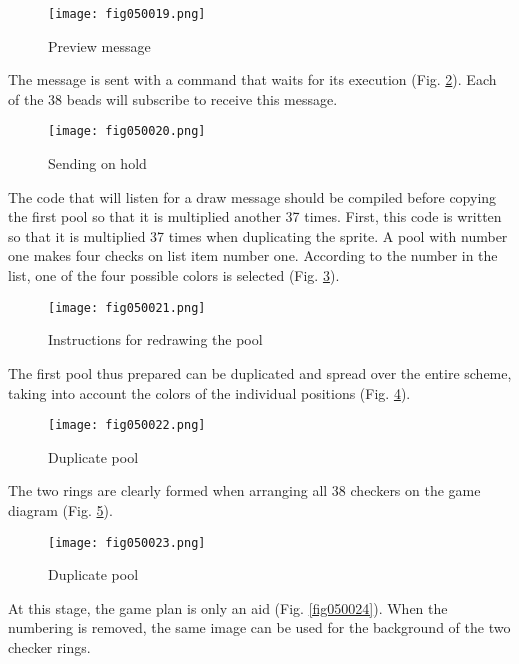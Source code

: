 \begin{figure}[H]
   \centering
   \texttt{[image: fig050019.png]}
   \caption{Preview message}
\label{fig050019}
\end{figure}

The message is sent with a command that waits for its execution (Fig. \ref{fig050020}). Each of the 38 beads will subscribe to receive this message.

\begin{figure}[H]
   \centering
   \texttt{[image: fig050020.png]}
   \caption{Sending on hold}
\label{fig050020}
\end{figure}

The code that will listen for a draw message should be compiled before copying the first pool so that it is multiplied another 37 times. First, this code is written so that it is multiplied 37 times when duplicating the sprite. A pool with number one makes four checks on list item number one. According to the number in the list, one of the four possible colors is selected (Fig. \ref{fig050021}).

\begin{figure}[H]
   \centering
   \texttt{[image: fig050021.png]}
   \caption{Instructions for redrawing the pool}
\label{fig050021}
\end{figure}

The first pool thus prepared can be duplicated and spread over the entire scheme, taking into account the colors of the individual positions (Fig. \ref{fig050022}).

\begin{figure}[H]
   \centering
   \texttt{[image: fig050022.png]}
   \caption{Duplicate pool}
\label{fig050022}
\end{figure}

The two rings are clearly formed when arranging all 38 checkers on the game diagram (Fig. \ref{fig050023}).

\begin{figure}[H]
   \centering
   \texttt{[image: fig050023.png]}
   \caption{Duplicate pool}
\label{fig050023}
\end{figure}

At this stage, the game plan is only an aid (Fig. \ref{fig050024}). When the numbering is removed, the same image can be used for the background of the two checker rings.

